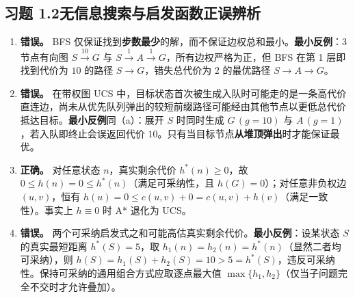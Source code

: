 \subsection*{习题 1.2\quad 无信息搜索与启发函数正误辨析}
\begin{enumerate}[label=(\alph*), leftmargin=1.8em]
  \item \textbf{错误。} BFS 仅保证找到\textbf{步数最少}的解，而不保证边权总和最小。\textbf{最小反例}：3 节点有向图 $S \xrightarrow{10} G$ 与 $S \xrightarrow{1} A \xrightarrow{1} G$，所有边权严格为正，但 BFS 在第 1 层即找到代价为 $10$ 的路径 $S\to G$，错失总代价为 $2$ 的最优路径 $S\to A\to G$。
  \item \textbf{错误。} 在带权图 UCS 中，目标状态首次被生成入队时可能走的是一条高代价直连边，尚未从优先队列弹出的较短前缀路径可能经由其他节点以更低总代价抵达目标。\textbf{最小反例}同（a）：展开 $S$ 时同时生成 $G\,(g=10)$ 与 $A\,(g=1)$，若入队即终止会误返回代价 $10$。只有当目标节点\textbf{从堆顶弹出}时才能保证最优。
  \item \textbf{正确。} 对任意状态 $n$，真实剩余代价 $h^*(n) \ge 0$，故 $0 \le h(n)=0 \le h^*(n)$（满足可采纳性，且 $h(G)=0$）；对任意非负权边 $(u, v)$，恒有 $h(u)=0 \le c(u,v) + 0 = c(u,v) + h(v)$（满足一致性）。事实上 $h\equiv 0$ 时 A* 退化为 UCS。
  \item \textbf{错误。} 两个可采纳启发式之和可能高估真实剩余代价。\textbf{最小反例}：设某状态 $S$ 的真实最短距离 $h^*(S)=5$，取 $h_1(n) = h_2(n) = h^*(n)$（显然二者均可采纳），则 $h(S) = h_1(S)+h_2(S) = 10 > 5 = h^*(S)$，违反可采纳性。保持可采纳的通用组合方式应取逐点最大值 $\max\{h_1, h_2\}$（仅当子问题完全不交时才允许叠加）。
\end{enumerate}

